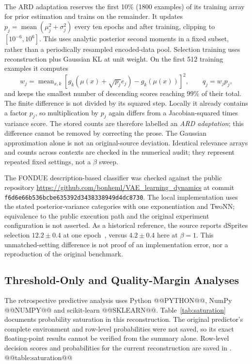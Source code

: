 The ARD adaptation reserves the first 10\% (1800 examples) of its
training array for prior estimation and trains on the remainder.
It updates $p_j=\operatorname{mean}(\mu_j^2+\sigma_j^2)$ every ten
epochs and after training, clipping to $[10^{-6},10^6]$.
This uses analytic posterior second moments in a fixed subset, rather
than a periodically resampled encoded-data pool. Selection training uses
reconstruction plus Gaussian KL at unit weight. On the first 512
training examples it computes
\begin{equation}
 w_j=\operatorname{mean}_{x,k}
 [g_k(\mu(x)+\sqrt{p_j}e_j)-g_k(\mu(x))]^2,
 \qquad q_j=w_jp_j,
 \label{eq:ardlocal}
\end{equation}
and keeps the smallest number of descending scores reaching 99\% of
their total. The finite difference is not divided by its squared step.
Locally it already contains a factor $p_j$, so multiplication by $p_j$
again differs from a Jacobian-squared times variance score. The stored
counts are therefore labelled an \emph{ARD adaptation}; this difference
cannot be removed by correcting the prose. The Gaussian approximation
alone is not an original-source deviation. Identical relevance arrays
and counts across contexts are checked in the numerical audit; they
represent repeated fixed settings, not a $\beta$ sweep.

The FONDUE description-based classifier was checked against the public
repository \url{https://github.com/bonheml/VAE_learning_dynamics} at
commit \texttt{f6d6e66b536bcbe635392d3438338949d4dc8730}. The local
implementation uses the stated posterior-variance categories with one
exponentiation and TwoNN; equivalence to the public execution path and
the original experiment configuration is not asserted. As a historical
reference, the source reports dSprites selection $12.2\pm0.4$ at one
epoch~\cite{bonheme2022fondue}, versus $4.2\pm0.4$ here at $\beta=1$.
This unmatched-setting difference is not proof of an implementation
error, nor a reproduction of the original benchmark.

\subsection{Threshold-Only and Quality-Margin Analyses}\label{app:sensitivity}
The retrospective predictive analysis uses Python @@PYTHON@@,
NumPy @@NUMPY@@ and scikit-learn @@SKLEARN@@. Table~\ref{tab:saturation}
documents probability saturation in this reconstruction. The original
predictor's complete environment and row-level probabilities were not
saved, so its exact floating-point results cannot be verified from the
summary alone. Row-level decision scores and probabilities for the
current reconstruction are saved in .
@@table:saturation@@

